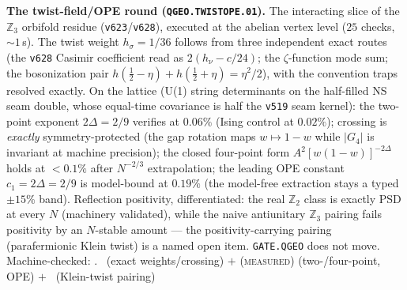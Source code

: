 \par\smallskip\noindent\textbf{The twist-field/OPE round
(\texttt{QGEO.TWISTOPE.01}).}
The interacting slice of the $\mathbb Z_3$ orbifold residue
(\texttt{v623}/\texttt{v628}), executed at the abelian vertex level
($25$ checks, ${\sim}1$\,s).  The twist weight $h_\sigma=1/36$ follows
from three independent exact routes (the \texttt{v628} Casimir
coefficient read as $2(h_\nu-c/24)$; the $\zeta$-function mode sum;
the bosonization pair $h(\tfrac12{-}\eta)+h(\tfrac12{+}\eta)=\eta^2/2$),
with the convention traps resolved exactly.  On the lattice (U(1)
string determinants on the half-filled NS seam double, whose
equal-time covariance is half the \texttt{v519} seam kernel): the
two-point exponent $2\Delta=2/9$ verifies at $0.06\%$
(Ising control at $0.02\%$); crossing is \emph{exactly}
symmetry-protected (the gap rotation maps $w\mapsto1{-}w$ while
$|G_4|$ is invariant at machine precision); the closed four-point form
$A^2[w(1{-}w)]^{-2\Delta}$ holds at $<0.1\%$ after $N^{-2/3}$
extrapolation; the leading OPE constant $c_1=2\Delta=2/9$ is
model-bound at $0.19\%$ (the model-free extraction stays a typed
$\pm15\%$ band).  Reflection positivity, differentiated: the real
$\mathbb Z_2$ class is exactly PSD at every $N$ (machinery validated),
while the naive antiunitary $\mathbb Z_3$ pairing fails positivity by
an $N$-stable amount --- the positivity-carrying pairing
(parafermionic Klein twist) is a named open item.  \texttt{GATE.QGEO}
does not move.
Machine-checked: .
\mE\ (exact weights/crossing) $+$ (\textsc{measured}) (two-/four-point,
OPE) $+$ \mO\ (Klein-twist pairing)
\par\smallskip

